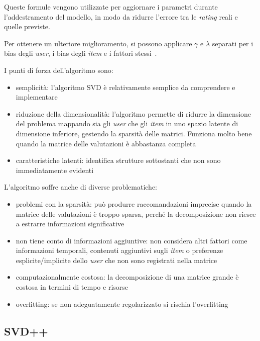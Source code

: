 Queste formule vengono utilizzate per aggiornare i parametri durante l'addestramento del modello, in modo da ridurre l'errore tra le
\textit{rating} reali e quelle previste.

Per ottenere un ulteriore miglioramento, si possono applicare $\gamma$ e $\lambda$ separati per i bias degli \textit{user}, i bias degli
\textit{item} e i fattori stessi~\cite{SVD_optimized}.

I punti di forza dell'algoritmo sono:

\begin{itemize}
    \item semplicità: l'algoritmo SVD è relativamente semplice da comprendere e implementare
    \item riduzione della dimensionalità: l'algoritmo permette di ridurre la dimensione del problema mappando sia gli \textit{user} che gli \textit{item} in uno spazio latente di dimensione inferiore, gestendo la sparsità delle matrici. Funziona molto bene quando la matrice delle valutazioni è abbastanza completa
    \item caratteristiche latenti: identifica strutture sottostanti che non sono immediatamente evidenti
\end{itemize}

L'algoritmo soffre anche di diverse problematiche:

\begin{itemize}
    \item problemi con la sparsità: può produrre raccomandazioni imprecise quando la matrice delle valutazioni è troppo sparsa, perché la decomposizione non riesce a estrarre informazioni significative
    \item non tiene conto di informazioni aggiuntive: non considera altri fattori come informazioni temporali, contenuti aggiuntivi sugli \textit{item} o preferenze esplicite/implicite dello \textit{user} che non sono registrati nella matrice
    \item computazionalmente costosa: la decomposizione di una matrice grande è costosa in termini di tempo e risorse
    \item overfitting: se non adeguatamente regolarizzato si rischia l'overfitting
\end{itemize}

\subsection{SVD++}

